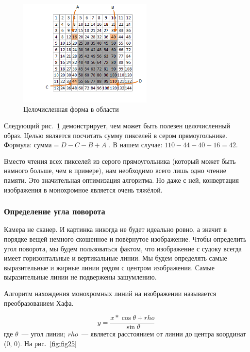 \begin{figure}[ht!]
  \centering
  \includegraphics[width=0.6\textwidth]{inc/raster/design2-4.png}
  \caption{Целочисленная форма в области}
  \label{fig:fig24}
\end{figure}
Следующий рис.~\ref{fig:fig24} демонстрирует, чем может быть полезен целочисленный образ. Целью является посчитать сумму пикселей в сером прямоугольнике. 
Формула: $\text{сумма}=D{-}C{-}B{+}A$ . В нашем случае: $110-44-40+16=42$.

Вместо чтения всех пикселей из серого прямоугольника (который может быть намного больше, чем в примере), нам необходимо всего лишь одно чтение памяти. Это значительная оптимизация алгоритма. Но даже с ней, конвертация изображения в монохромное является очень тяжёлой. 


\subsubsection{Определение угла поворота}
Камера не сканер. И картинка никогда не будет идеально ровно, а значит в порядке вещей немного скошенное и повёрнутое изображение. Чтобы определить угол поворота, мы будем пользоваться фактом, что изображение с судоку всегда имеет горизонтальные и вертикальные линии. Мы будем определять самые выразительные и жирные линии рядом с центром изображения. Самые выразительные линии не подвержены зашумлению.

Алгоритм нахождения монохромных линий на изображении называется преобразованием Хафа. 

\begin{equation}
\label{f:angleOfRotation}
y = \frac{x * \cos \theta + rho}{\sin \theta}
\end{equation}
где $\theta$~--- угол линии; $rho$~--- является расстоянием от линии до центра координат (0, 0). На риc.~\ref{fig:fig25}

